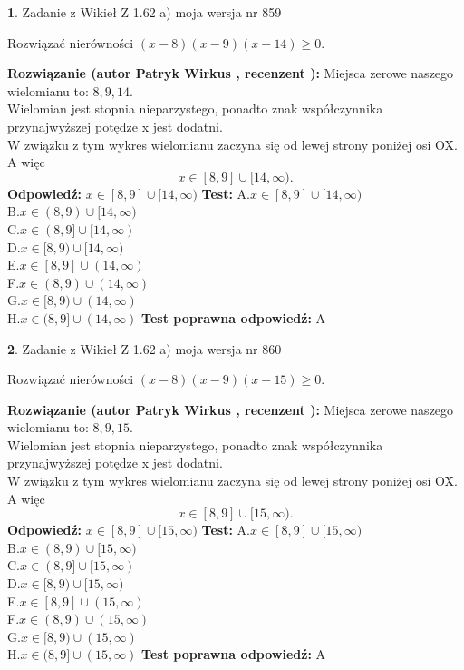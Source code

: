 \documentclass[12pt, a4paper]{article}
\theoremstyle{definition} %
\newtheorem{zad}{}
\newcommand{\zadStart}[1]{\begin{zad}#1\newline}
\newcommand{\zadStop}{\end{zad}}
\newcommand{\rozwStart}[2]{\noindent \textbf{Rozwiązanie (autor #1 , recenzent #2): }\newline}
\newcommand{\rozwStop}{\newline}
\newcommand{\odpStart}{\noindent \textbf{Odpowiedź:}\newline}
\newcommand{\odpStop}{\newline}
\newcommand{\testStart}{\noindent \textbf{Test:}\newline}
\newcommand{\testStop}{\newline}
\newcommand{\kluczStart}{\noindent \textbf{Test poprawna odpowiedź:}\newline}
\newcommand{\kluczStop}{\newline}
\begin{document}
\zadStart{Zadanie z Wikieł Z 1.62 a) moja wersja nr 859}

Rozwiązać nierówności $(x-8)(x-9)(x-14)\ge0$.
\zadStop
\rozwStart{Patryk Wirkus}{}
Miejsca zerowe naszego wielomianu to: $8, 9, 14$.\\
Wielomian jest stopnia nieparzystego, ponadto znak współczynnika przy\linebreak najwyższej potędze x jest dodatni.\\ W związku z tym wykres wielomianu zaczyna się od lewej strony poniżej osi OX. A więc $$x \in [8,9] \cup [14,\infty).$$
\rozwStop
\odpStart
$x \in [8,9] \cup [14,\infty)$
\odpStop
\testStart
A.$x \in [8,9] \cup [14,\infty)$\\
B.$x \in (8,9) \cup [14,\infty)$\\
C.$x \in (8,9] \cup [14,\infty)$\\
D.$x \in [8,9) \cup [14,\infty)$\\
E.$x \in [8,9] \cup (14,\infty)$\\
F.$x \in (8,9) \cup (14,\infty)$\\
G.$x \in [8,9) \cup (14,\infty)$\\
H.$x \in (8,9] \cup (14,\infty)$
\testStop
\kluczStart
A
\kluczStop



\zadStart{Zadanie z Wikieł Z 1.62 a) moja wersja nr 860}

Rozwiązać nierówności $(x-8)(x-9)(x-15)\ge0$.
\zadStop
\rozwStart{Patryk Wirkus}{}
Miejsca zerowe naszego wielomianu to: $8, 9, 15$.\\
Wielomian jest stopnia nieparzystego, ponadto znak współczynnika przy\linebreak najwyższej potędze x jest dodatni.\\ W związku z tym wykres wielomianu zaczyna się od lewej strony poniżej osi OX. A więc $$x \in [8,9] \cup [15,\infty).$$
\rozwStop
\odpStart
$x \in [8,9] \cup [15,\infty)$
\odpStop
\testStart
A.$x \in [8,9] \cup [15,\infty)$\\
B.$x \in (8,9) \cup [15,\infty)$\\
C.$x \in (8,9] \cup [15,\infty)$\\
D.$x \in [8,9) \cup [15,\infty)$\\
E.$x \in [8,9] \cup (15,\infty)$\\
F.$x \in (8,9) \cup (15,\infty)$\\
G.$x \in [8,9) \cup (15,\infty)$\\
H.$x \in (8,9] \cup (15,\infty)$
\testStop
\kluczStart
A
\kluczStop
\end{document}
